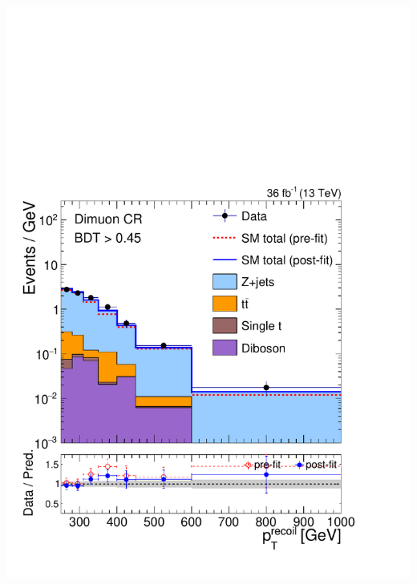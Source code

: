 \documentclass[aspectratio=169,xcolor=dvipsnames,,table,compress]{beamer}
\begin{document}
\begin{frame}[t]
\begin{columns}[T]
\begin{column}{0.125\textwidth}
      \includegraphics[width=\textwidth]{../figures/monotop/postfit/stackedPostfit_dimuon_monotop.pdf}\\ 

\end{column}
\end{columns}
\end{frame}
\end{document}
